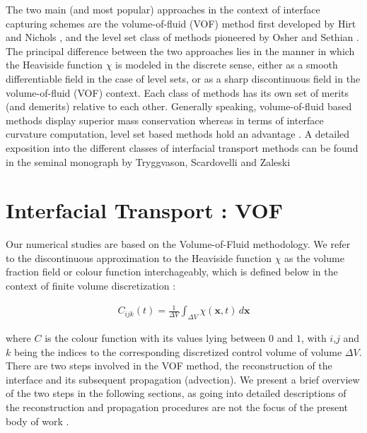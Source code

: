 The two main (and most popular)
approaches in the context of interface capturing schemes are the 
volume-of-fluid (VOF) method first developed by Hirt and Nichols \cite{hirt1981volume}, 
and the level set class of methods pioneered by Osher and Sethian \cite{osher1988fronts}.
The principal difference between the two approaches lies in the manner in which
the Heaviside function $\chi$ is modeled in the discrete sense, 
either as a smooth differentiable field in
the case of level sets, or as a sharp discontinuous field in the volume-of-fluid (VOF) context.  
Each class of methods has its own set of merits (and demerits) relative to each other. 
Generally speaking, volume-of-fluid based methods display superior mass conservation
whereas in terms of interface curvature computation, level set based methods hold an advantage
 . 
A detailed exposition into the different classes of interfacial transport
methods can be found in the seminal monograph by Tryggvason, Scardovelli and Zaleski \cite{zaleskibook}


\section{Interfacial Transport : VOF}
Our numerical studies are based on the Volume-of-Fluid methodology. 
We refer to the discontinuous approximation to the Heaviside function
$\chi$ as the volume fraction field or colour function interchageably, which 
is defined below in the context of finite volume discretization : 

\begin{align} 
	C_{ijk}\left(t\right) = \frac{1}{\Delta V} \displaystyle\int_{\Delta V} \chi(\boldsymbol{x},t) \,d\boldsymbol x 
\end{align}

where $C$ is the colour function with its values lying between $0$ and $1$, 
with $i$,$j$ and $k$ being the indices to the corresponding discretized control volume of volume $\Delta V$.  
There are two steps involved in the VOF method, the reconstruction of the interface and its 
subsequent propagation (advection). We present a brief overview of the two steps in the following sections,
as going into detailed descriptions of the reconstruction and propagation procedures are 
not the focus of the present body of work .  


